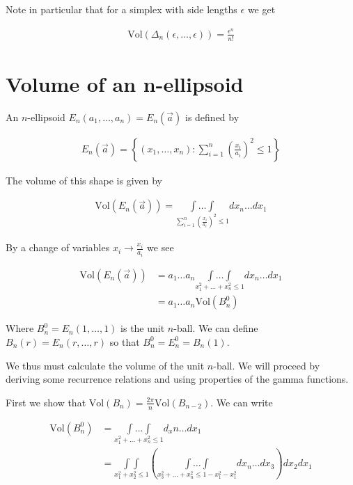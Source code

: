 \documentclass[12pt]{article}
\begin{document}
Note in particular that for a simplex with side lengths $\epsilon$ we get

\begin{align}
\text{Vol}(\Delta_n(\epsilon,\ldots,\epsilon)) = \frac{\epsilon^n}{n!}
\end{align}

\section{Volume of an n-ellipsoid}

An $n$-ellipsoid $E_n(a_1,\ldots,a_n) = E_n(\vec{a})$ is defined by

\begin{align}
E_n(\vec{a}) = \left\{ (x_1,\ldots,x_n): \sum_{i=1}^n \left(\frac{x_i}{a_i}\right)^2 \le 1\right\}
\end{align}

The volume of this shape is given by

\begin{align}
\text{Vol}\left(E_n(\vec{a}) \right) = \underset{\sum_{i=1}^n \left(\frac{x_i}{a_i}\right)^2 \le 1}{\int\ldots \int} dx_n\ldots dx_1
\end{align}

By a change of variables $x_i \rightarrow \frac{x_i}{a_i}$ we see

\begin{align}
\text{Vol}(E_n(\vec{a})) &= a_1\ldots a_n \underset{x_1^2+\ldots+x_n^2 \le 1}{\int\ldots \int}dx_n \ldots dx_1\\
&= a_1\ldots a_n \text{Vol}(B_n^0)
\end{align}

Where $B_n^0 = E_n(1,\ldots,1)$ is the unit $n$-ball. We can define $B_n(r) = E_n(r,\ldots,r)$ so that $B_n^0 = E_n^0 = B_n(1)$.

We thus must calculate the volume of the unit $n$-ball. We will proceed by deriving some recurrence relations and using properties of the gamma functions.

First we show that $\text{Vol}(B_n) = \frac{2\pi}{n} \text{Vol}(B_{n-2})$. We can write

\begin{align}
\text{Vol}(B_n^0) &= \underset{x_1^2+\ldots+x_n^2\le 1}{\int \ldots \int} d_xn\ldots dx_1\\
&= \underset{x_1^2+x_2^2\le 1}{\int\int}\left(\underset{x_3^2+\ldots+x_n^2\le 1- x_1^2-x_1^2}{\int\ldots \int} dx_n\ldots dx_3 \right)dx_2dx_1
\end{align}
\end{document}
